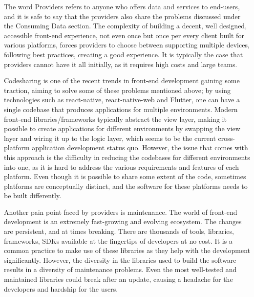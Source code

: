 The word Providers refers to anyone who offers data and services to end-users, and it is safe to say that the providers also share the problems discussed under the Consuming Data section. The complexity of building a decent, well designed, accessible front-end experience, not even once but once per every client built for various platforms, forces providers to choose between supporting multiple devices, following best practices, creating a good experience. It is typically the case that providers cannot have it all initially, as it requires high costs and large teams. 

Codesharing is one of the recent trends in front-end development gaining some traction, aiming to solve some of these problems mentioned above; by using technologies such as react-native, react-native-web and Flutter, one can have a single codebase that produces applications for multiple environments. Modern front-end libraries/frameworks typically abstract the view layer, making it possible to create applications for different environments by swapping the view layer and wiring it up to the logic layer, which seems to be the current cross-platform application development status quo. However, the issue that comes with this approach is the difficulty in reducing the codebases for different environments into one, as it is hard to address the various requirements and features of each platform. Even though it is possible to share some extent of the code, sometimes platforms are conceptually distinct, and the software for these platforms needs to be built differently. 

Another pain point faced by providers is maintenance. The world of front-end development is an extremely fast-growing and evolving ecosystem. The changes are persistent, and at times breaking. There are thousands of tools, libraries, frameworks, SDKs available at the fingertips of developers at no cost. It is a common practice to make use of these libraries as they help with the development significantly. However, the diversity in the libraries used to build the software results in a diversity of maintenance problems. Even the most well-tested and maintained libraries could break after an update, causing a headache for the developers and hardship for the users.